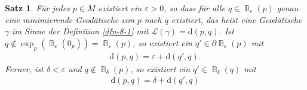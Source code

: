 \documentclass[paper=A4, twoside, chapterprefix=true, bibliography=totoc, headsepline]{scrbook}
\let\temp\phi{}
\let\phi\varphi{}
\let\varphi\temp{}
\let\temp\theta{}
\let\theta\vartheta{}
\let\vartheta\temp{}
\let\temp\epsilon{}
\let\epsilon\varepsilon{}
\let\varepsilon\temp{}
\let\temp\rho{}
\let\rho\varrho{}
\let\varrho\temp{}
\DeclareMathOperator{\B}{\mathbb{B}} %
\newcommand{\dop}{\mathrm{d}}
\theoremstyle{plain}
\newtheorem{Satz}[Dfn]{Satz}
\theoremstyle{nonumberplain}
\theoremstyle{empty}
\theoremstyle{break}
\begin{document}
\begin{Satz}\label{satz-8-7}
  F\"ur jedes $p \in M$ existiert ein $\epsilon > 0$, so dass f\"ur alle $q \in \B_{\epsilon}(p)$ genau eine minimierende Geod\"atische von $p$ nach $q$ existiert, das hei\"st eine Geod\"atische $\gamma$ im Sinne der Definition \ref{dfn-8-1} mit $\mathcal L(\gamma) = \dop(p,q)$.
  Ist $q \notin \exp_p(\B_{\epsilon}(0_p)) = \B_{\epsilon}(p)$, so existiert ein $q' \in \partial \B_{\epsilon}(p)$ mit
  \begin{align*}
    \dop(p,q) = \epsilon + \dop(q',q).
  \end{align*}
  Ferner, ist $\delta < \epsilon$ und $q \notin \B_\delta(p)$, so existiert ein $q' \in \B_\delta(q)$ mit
  \begin{align*}
    \dop(p,q) = \delta + \dop(q',q)
  \end{align*}
  \begin{center}\end{center}
\end{Satz}
\end{document}
